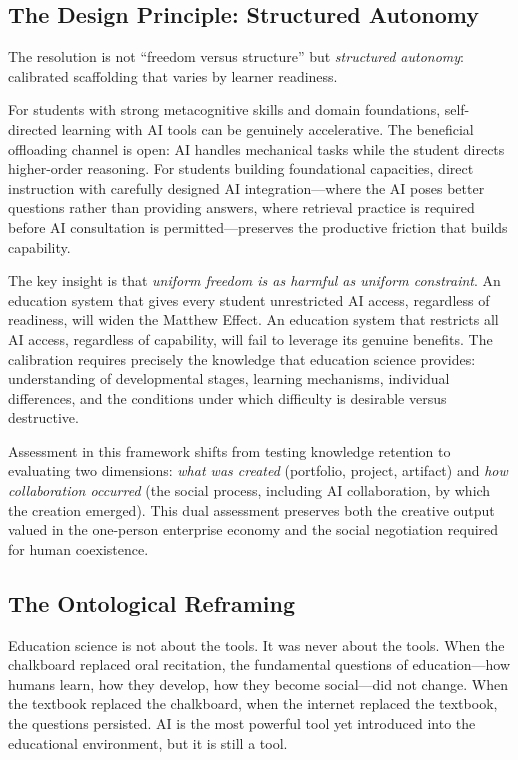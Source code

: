 \documentclass[12pt]{article}
\begin{document}
\subsection{The Design Principle: Structured Autonomy}
\label{sec:structured-autonomy}

The resolution is not ``freedom versus structure'' but \emph{structured autonomy}: calibrated scaffolding that varies by learner readiness.

For students with strong metacognitive skills and domain foundations, self-directed learning with AI tools can be genuinely accelerative. The beneficial offloading channel is open: AI handles mechanical tasks while the student directs higher-order reasoning. For students building foundational capacities, direct instruction with carefully designed AI integration---where the AI poses better questions rather than providing answers, where retrieval practice is required before AI consultation is permitted---preserves the productive friction that builds capability.

The key insight is that \emph{uniform freedom is as harmful as uniform constraint}. An education system that gives every student unrestricted AI access, regardless of readiness, will widen the Matthew Effect. An education system that restricts all AI access, regardless of capability, will fail to leverage its genuine benefits. The calibration requires precisely the knowledge that education science provides: understanding of developmental stages, learning mechanisms, individual differences, and the conditions under which difficulty is desirable versus destructive.

Assessment in this framework shifts from testing knowledge retention to evaluating two dimensions: \emph{what was created} (portfolio, project, artifact) and \emph{how collaboration occurred} (the social process, including AI collaboration, by which the creation emerged). This dual assessment preserves both the creative output valued in the one-person enterprise economy and the social negotiation required for human coexistence.

\subsection{The Ontological Reframing}
\label{sec:ontological}

Education science is not about the tools. It was never about the tools. When the chalkboard replaced oral recitation, the fundamental questions of education---how humans learn, how they develop, how they become social---did not change. When the textbook replaced the chalkboard, when the internet replaced the textbook, the questions persisted. AI is the most powerful tool yet introduced into the educational environment, but it is still a tool.
\end{document}
